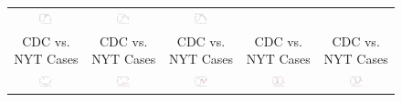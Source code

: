 \documentclass[9pt,twoside,lineno]{pnas-new}
\theoremstyle{definition}
\begin{document}
\begin{figure}[!ht]
{\begin{minipage}{\linewidth}
\begin{tabular}{c|c|c|c|c}
      \includegraphics[width=0.20\textwidth]{tables_and_figures/schoolPennsylvaniaCentre}&
      \includegraphics[width=0.20\textwidth]{tables_and_figures/schoolIowaStory}& 
      \includegraphics[width=0.20\textwidth]{tables_and_figures/schoolIllinoisChampaign}\\    
   CDC vs. NYT  Cases &  CDC vs. NYT  Cases & CDC vs. NYT  Cases &  CDC vs. NYT  Cases& CDC vs. NYT  Cases  \\ 
          \includegraphics[width=0.20\textwidth]{tables_and_figures/churchArizonaPima}&
      \includegraphics[width=0.20\textwidth]{tables_and_figures/churchMichiganIngham}&
      \includegraphics[width=0.20\textwidth]{tables_and_figures/churchPennsylvaniaCentre}&
      \includegraphics[width=0.20\textwidth]{tables_and_figures/churchIowaStory}& 
      \includegraphics[width=0.20\textwidth]{tables_and_figures/churchIllinoisChampaign}\\     

\end{tabular}
\end{minipage}}
\end{figure}
\end{document}
